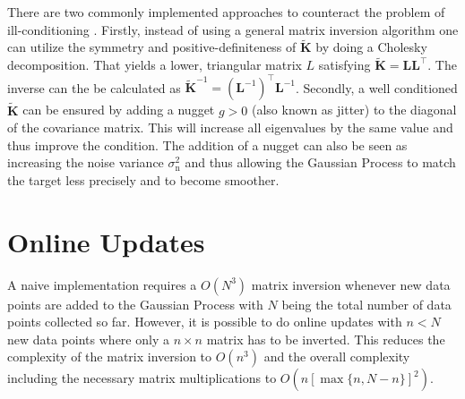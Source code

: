 \documentclass[11pt,a4paper]{scrreprt}
\newcommand{\mat}[1]{\bm{#1}}
\newcommand{\T}{^{\top}}
\begin{document}
There are two commonly implemented approaches to counteract the problem of 
ill-conditioning \parencite[cp.]{Sacks:1989cv, Neal:1997tj, Booker:1999wz, 
    Gramacy:2008es}. Firstly, instead of using a general matrix inversion 
algorithm one can utilize the symmetry and positive-definiteness of $\tilde{\mat 
    K}$ by doing a Cholesky decomposition. That yields a lower, triangular 
matrix $L$ satisfying $\tilde{\mat K} = \mat L\mat L\T$. The inverse can the be 
calculated as $\tilde{\mat K}^{-1} = (\mat L^{-1})\T \mat L^{-1}$. Secondly, 
a well conditioned $\tilde{\mat K}$ can be ensured by adding a nugget $g > 0$ 
(also known as jitter) to the diagonal of the covariance matrix. This will 
increase all eigenvalues by the same value and thus improve the condition.  The 
addition of a nugget can also be seen as increasing the noise variance 
$\sigma_{\text{n}}^2$ and thus allowing the Gaussian Process to match the target 
less precisely and to become smoother.


\section{Online Updates}
A naive implementation requires a $O(N^3)$ matrix inversion whenever new data 
points are added to the Gaussian Process with $N$ being the total number of data 
points collected so far. However, it is possible to do online updates with $n 
< N$ new data points where only a $n \times n$ matrix has to be inverted. This 
reduces the complexity of the matrix inversion to $O(n^3)$ and the overall 
complexity including the necessary matrix multiplications to $O(n [\max\{n, 
N - n\}]^2)$.
\end{document}
